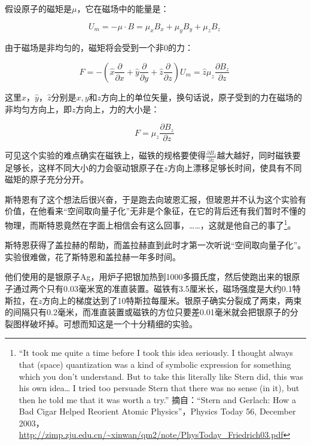 
假设原子的磁矩是$\mu$，它在磁场中的能量是：

\begin{equation}
U_m = - \mu \cdot B = \mu_x B_x + \mu_y B_y + \mu_z B_z ~
\end{equation}

由于磁场是非均匀的，磁矩将会受到一个非0的力：

\begin{equation}
F = - \left( \hat x \frac{\partial }{\partial x} + \hat y \frac{\partial }{\partial y}  + \hat z \frac{\partial }{\partial z}  \right) U_m  = \hat z  \mu_z  \frac{\partial B_z }{\partial z}~
\end{equation}

这里$\hat x $，$\hat y $，$\hat z $分别是$x, y$和$z$方向上的单位矢量，换句话说，原子受到的力在磁场的非均匀方向上，即$z$方向上，力的大小是：

\begin{equation}
F =  \mu_z  \frac{\partial B_z }{\partial z}~
\end{equation}

可见这个实验的难点确实在磁铁上，磁铁的规格要使得$\frac{\partial B_z}{\partial z}$越大越好，同时磁铁要足够长，这样不同大小的力会驱动银原子在$z$方向上漂移足够长时间，使具有不同磁矩的原子充分分开。


斯特恩有了这个想法后很兴奋，于是跑去向玻恩汇报，但玻恩并不认为这个实验有价值，在他看来“空间取向量子化”无非是个象征，在它的背后还有我们暂时不懂的物理，而斯特恩竟然在字面上相信会有这么回事，……，这就是他自己的事了\footnote{“It took me quite a time before I took this idea seriously. I thought always that (space) quantization was a kind of symbolic expression for something which you don’t understand. But to take this literally like Stern did, this was his own idea… I tried too persuade Stern that there was no sense (in it), but then he told me that it was worth a try.” 摘自：“Stern and Gerlach: How a Bad Cigar Helped Reorient Atomic Physics”，Physics Today 56, December 2003， \url{http://zimp.zju.edu.cn/~xinwan/qm2/note/PhysToday_Friedrich03.pdf}}。

斯特恩获得了盖拉赫的帮助，而盖拉赫直到此时才第一次听说“空间取向量子化”。实验很难做，花了斯特恩和盖拉赫一年多时间。

他们使用的是银原子Ag，用炉子把银加热到1000多摄氏度，然后使跑出来的银原子通过两个只有0.03毫米宽的准直装置。磁铁有3.5厘米长，磁场强度是大约0.1特斯拉，在$z$方向上的梯度达到了10特斯拉每厘米。银原子确实分裂成了两束，两束的间隔只有0.2毫米，而准直装置或磁铁的方位只要差0.01毫米就会把银原子的分裂图样破坏掉。可想而知这是一个十分精细的实验。

